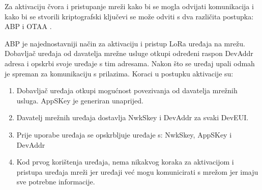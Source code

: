 \documentclass[times, utf8, diplomski]{fer}
\begin{document}
Za aktivaciju čvora i pristupanje mreži kako bi se mogla odvijati komunikacija i kako bi se stvorili kriptografski ključevi se može odviti s dva različita postupka: ABP  i OTAA .

ABP je najednostavniji način za aktivaciju i pristup LoRa uređaja na mrežu. Dobavljač uređaja od davatelja mrežne usluge otkupi određeni raspon DevAddr adresa i opskrbi svoje uređaje s tim adresama. Nakon što se uređaj upali odmah je spreman za komunikaciju s prilazima. Koraci u postupku aktivacije su:
\begin{enumerate}
    \item Dobavljač uređaja otkupi mogućnost povezivanja od davatelja mrežnih usluga. AppSKey je generiran unaprijed.
    \item Davatelj mrežnih uređaja dostavlja NwkSkey i DevAddr za svaki DevEUI.
    \item Prije uporabe uređaja se opskrbljuje uređaje s: NwkSkey, AppSKey i DevAddr
    \item Kod prvog korištenja uređaja, nema nikakvog koraka za aktivacijom i pristupa uređaja mreži jer uređaji već mogu komunicirati s mrežom jer imaju sve potrebne informacije.
\end{enumerate}
\end{document}
